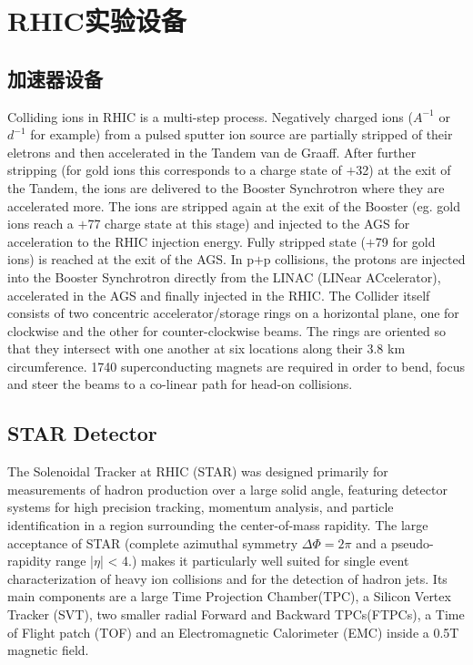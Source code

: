 \chapter{RHIC实验设备}
\section{加速器设备}
Colliding ions in RHIC is a multi-step process.
Negatively charged ions ($A^{-1}$ or $d^{-1}$ for example) from a pulsed sputter ion source are partially stripped of their eletrons and then accelerated in the Tandem van de Graaff.
After further stripping (for gold ions this corresponds to a charge state of $+$32) at the exit of the Tandem,
the ions are delivered to the Booster Synchrotron where they are accelerated more.
The ions are stripped again at the exit of the Booster (eg. gold ions reach a $+$77 charge state at this stage) and injected to the AGS for acceleration to the RHIC injection energy.
Fully stripped state ($+$79 for gold ions) is reached at the exit of the AGS.
In p$+$p collisions, the protons are injected into the Booster Synchrotron directly from the LINAC (LINear ACcelerator), accelerated in the AGS and finally injected in the RHIC.
The Collider itself consists of two concentric accelerator/storage rings on a horizontal plane, one for clockwise and the other for counter-clockwise beams.
The rings are oriented so that they intersect with one another at six locations along their 3.8 km circumference.
1740 superconducting magnets are required in order to bend,
focus and steer the beams to a co-linear path for head-on collisions.

\section{STAR Detector}
The Solenoidal Tracker at RHIC (STAR) was designed primarily for measurements of hadron production over a large solid angle,
featuring detector systems for high precision tracking,
momentum analysis,
and particle identification in a region surrounding the center-of-mass rapidity.
The large acceptance of STAR (complete azimuthal symmetry $\Delta\Phi = 2\pi$ and a pseudo-rapidity range |$\eta$| < 4.) makes it particularly well suited for single event characterization of heavy ion collisions and for the detection of hadron jets.
Its main components are a large Time Projection Chamber(TPC),
a Silicon Vertex Tracker (SVT),
two smaller radial Forward and Backward TPCs(FTPCs),
a Time of Flight patch (TOF) and an Electromagnetic Calorimeter (EMC) inside a 0.5T magnetic field.
